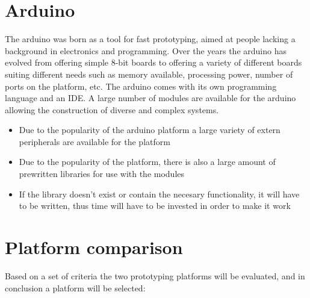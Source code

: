 \section{Arduino}
The arduino was born as a tool for fast prototyping, aimed at people lacking a
background in electronics and programming. Over the years the arduino has
evolved from offering simple 8-bit boards to offering a variety of different
boards suiting different needs such as memory available, processing power,
number of ports on the platform, etc. The arduino comes with its own
programming language and an IDE. A large number of modules are available for
the arduino allowing the construction of diverse and complex systems.\Source

\begin{itemize}
	\item Due to the popularity of the arduino platform a large variety of extern
	peripherals are available for the platform
	\item Due to the popularity of the platform, there is also a large amount of
	prewritten libraries for use with the modules
	\item If the library doesn't exist or contain the necesary functionality, it
	will have to be written, thus time will have to be invested in order to make
	it work
\end{itemize}

\section{Platform comparison}
Based on a set of criteria the two prototyping platforms will be evaluated, and
in conclusion a platform will be selected:

